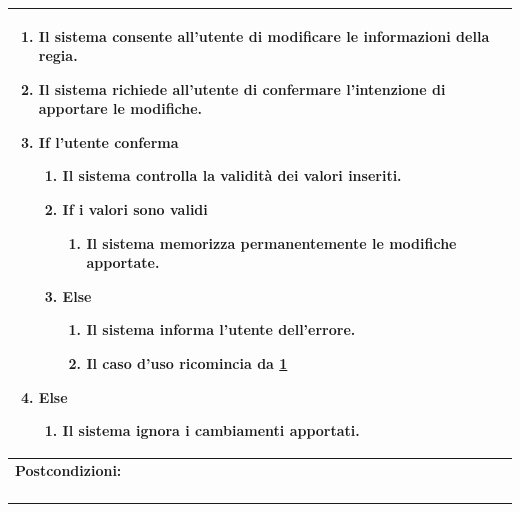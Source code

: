\documentclass{article}
\begin{document}
\begin{table}[H]
\begin{tabular}{|p{\linewidth}|}
\begin{enumerate}
                            \item Il sistema consente all'utente di modificare le informazioni della regia. \label{start_mod_regia}
                            \item Il sistema richiede all'utente di confermare l'intenzione di apportare le modifiche.
                            \item \textbf{If} l'utente conferma
                                \begin{enumerate}
                                    \item Il sistema controlla la validità dei valori inseriti.
                                    \item \textbf{If} i valori sono validi 
                                        \begin{enumerate}
                                            \item Il sistema memorizza permanentemente le modifiche apportate.
                                        \end{enumerate}
                                    \item \textbf{Else}
                                        \begin{enumerate}
                                            \item Il sistema informa l'utente dell'errore.
                                            \item Il caso d'uso ricomincia da \ref{start_mod_regia}
                                        \end{enumerate}
                                \end{enumerate}
                            \item \textbf{Else}
                                \begin{enumerate}
                                    \item Il sistema ignora i cambiamenti apportati.
                                \end{enumerate}
                        \end{enumerate} \\
                        \hline
                        \cellcolor{gray!20}
                        \textbf{Postcondizioni:} \\
                        \cellcolor{gray!20}
                        \begin{minipage}{\linewidth}
                            \begin{enumerate}

\end{enumerate}
\end{minipage}
\end{tabular}
\end{table}
\end{document}
